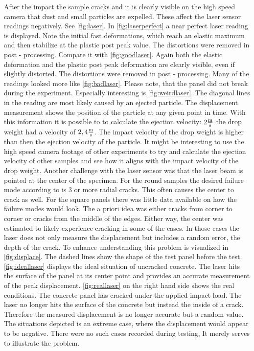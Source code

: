 After the impact the sample cracks and it is clearly visible on the high speed camera that dust and small particles are expelled. These affect the laser sensor readings negatively. See \autoref{fig:laser}.
In \autoref{fig:laserperfect} a near perfect laser reading is displayed. Note the initial fast deformations, which reach an elastic maximum and then stabilize at the plastic post peak value. The distortions were removed in post - processing.
Compare it with \autoref{fig:goodlaser}. Again both the elastic deformation and the plastic post peak deformation are clearly visible, even if slightly distorted. The distortions were removed in post - processing.
Many of the readings looked more like \autoref{fig:badlaser}. Please note, that the panel did not break during the experiment.
Especially interesting is \autoref{fig:weirdlaser}. The diagonal lines in the reading are most likely caused by an ejected particle. The displacement measurement shows the position of the particle at any given point in time. With this information it is possible to  to calculate the ejection velocity: \( 2 \frac{\text{m}}{\text{s}}\) the drop weight had a velocity of \( 2,4 \frac{\text{m}}{\text{s}}\). 
The impact velocity of the drop weight is higher than then the ejection velocity of the particle. It might be interesting to use the high speed camera footage of other experiments to try and calculate the ejection velocity of other samples and see how it aligns with the impact velocity of the drop weight.
Another challenge with the laser sensor was that the laser beam is pointed at the center of the specimen. For the round samples the desired failure mode according to \textcite{c1550} is 3 or more radial cracks. This often causes the center to crack as well. 
For the square panels there was little data available on how the failure modes would look. The a priori idea was either cracks from corner to corner or cracks from the middle of the edges. Either way, the center was estimated to likely experience cracking in some of the cases. 
In those cases the laser does not only measure the displacement but includes a random error, the depth of the crack. To enhance understanding this problem is visualized in \autoref{fig:displace}. The dashed lines show the shape of the test panel before the test. \autoref{fig:ideallaser} displays the ideal situation of uncracked concrete. The laser hits the surface of the panel at its center point and provides an accurate measurement of the peak displacement. \autoref{fig:reallaser} on the right hand side shows the real conditions. The concrete panel has cracked under the applied impact load. The laser no longer hits the surface of the concrete but instead the inside of a crack. Therefore the measured displacement is no longer accurate but a random value. The situations depicted is an extreme case, where the displacement would appear to be negative. There were no such cases recorded during testing, It merely serves to illustrate the problem. 


